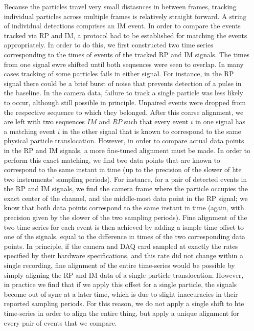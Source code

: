 		
		Because the particles travel very small distasnces in between frames, tracking individual particles across multiple frames is relatively straight forward. A string of individual detections comprises an IM event. In order to compare the events tracked via RP and IM, a protocol had to be established for matching the events appropriately. In order to do this, we first constructed two time series corresponding to the times of events of the tracked RP and IM signals. The times from one signal ewre shifted until both sequences were seen to overlap. In many cases tracking of some particles fails in either signal. For instance, in the RP signal there could be a brief burst of noise that prevents detection of a pulse in the baseline. In the camera data, failure to track a single particle was less likely to occur, although still possible in principle. Unpaired events were dropped from the respective sequence to which they belonged. After this coarse alignment, we are left with two sequences $IM$ and $RP$ such that every event $i$ in one signal has a matching event $i$ in the other signal that is known to correspond to the same physical particle translocation. However, in order to compare actual data points in the RP and IM signals, a more fine-tuned alignment must be made. In order to perform this exact matching, we find two data points that are known to correspond to the same instant in time (up to the precision of the slower of hte two instruments' sampling periods). For instance, for a pair of detected events in the RP and IM signals, we find the camera frame where the particle occupies the exact center of the channel, and the middle-most data point in the RP signal; we know that both data points correspond to the same instant in time (again, with precision given by the slower of the two sampling periods). Fine alignment of the two time series for each event is then achieved by adding a ismple time offset to one of the signals, equal to the difference in times of the two corresponding data points. In principle, if the camera and DAQ card sampled at exactly the rates specified by their hardware specifications, and this rate did not change within a single recording, fine alignment of the entire time-series would be possible by simply aligning the RP and IM data of a single particle translocation. However, in practice we find that if we apply this offset for a single particle, the signals become out of sync at a later time, which is due to slight inaccuracies in their reported sampling periods. For this reason, we do not apply a single shift to hte time-series in order to align the entire thing, but apply a unique alignment for every pair of events that we compare.
		
